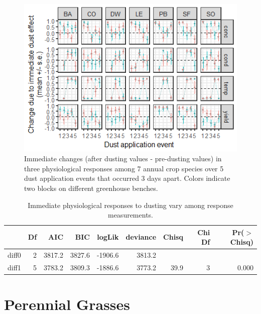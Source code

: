 \documentclass[]{scrartcl}
\begin{document}
\begin{figure}
\centering
\includegraphics{figures/diff_gg-1.png}
\caption{Immediate changes (after dusting values - pre-dusting values)
in three physiological responses among 7 annual crop species over 5 dust
application events that occurred 3 days apart. Colors indicate two
blocks on different greenhouse benches.}
\end{figure}

\begin{table}[ht]
\centering
\begin{tabular}{lrrrrrrrr}
  \hline
 & Df & AIC & BIC & logLik & deviance & Chisq & Chi Df & Pr($>$Chisq) \\ 
  \hline
diff0 & 2 & 3817.2 & 3827.6 & -1906.6 & 3813.2 &  &  &  \\ 
  diff1 & 5 & 3783.2 & 3809.3 & -1886.6 & 3773.2 & 39.9 & 3 & 0.000 \\ 
   \hline
\end{tabular}
\caption{Immediate physiological responses to dusting vary among response measurements.} 
\end{table}

\clearpage

\hypertarget{perennial-grasses}{%
\section{Perennial Grasses}\label{perennial-grasses}}
\end{document}
